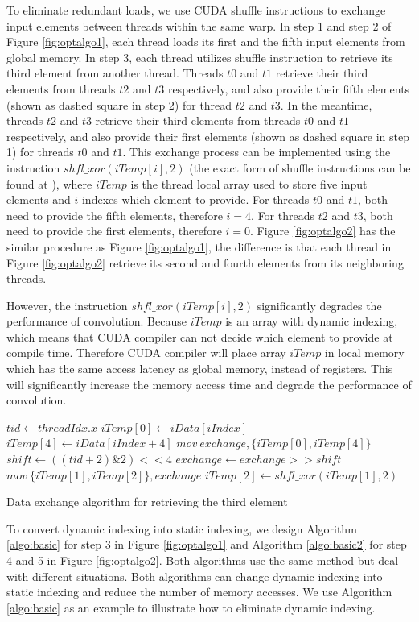 \documentclass[sigplan,review,anonymous]{acmart}\settopmatter{printfolios=true,printccs=false,printacmref=false}
\begin{document}
To eliminate redundant loads, we use CUDA shuffle instructions to exchange input elements between threads within the same warp. In step 1 and step 2 of Figure \ref{fig:optalgo1}, each thread loads its first and the fifth input elements from global memory. In step 3, each thread utilizes shuffle instruction to retrieve its third element from another thread. Threads $t0$ and $t1$ retrieve their third elements from threads $t2$ and $t3$ respectively, and also provide their fifth elements (shown as dashed square in step 2) for thread $t2$ and $t3$. In the meantime, threads $t2$ and $t3$ retrieve their third elements from threads $t0$ and $t1$ respectively, and also provide their first elements (shown as dashed square in step 1) for threads $t0$ and $t1$. This exchange process can be implemented using the instruction $shfl\_xor(iTemp[i],2)$ (the exact form of shuffle instructions can be found at \cite{CUDAtoolkit}), where $iTemp$ is the thread local array used to store five input elements and $i$ indexes which element to provide. For threads $t0$ and $t1$, both need to provide the fifth elements, therefore $i=4$. For threads $t2$ and $t3$, both need to provide the first elements, therefore $i=0$. Figure \ref{fig:optalgo2} has the similar procedure as Figure \ref{fig:optalgo1}, the difference is that each thread in Figure \ref{fig:optalgo2} retrieve its second and fourth elements from its neighboring threads.


However, the instruction $shfl\_xor(iTemp[i],2)$ significantly degrades the performance of convolution. Because $iTemp$ is an array with dynamic indexing, which means that CUDA compiler can not decide which element to provide at compile time. Therefore CUDA compiler will place array $iTemp$ in local memory which has the same access latency as global memory, instead of registers. This will significantly increase the memory access time and degrade the performance of convolution.

\begin{algorithm}
	$tid \gets threadIdx.x$\;
	$iTemp[0] \gets iData[iIndex]$\;
	$iTemp[4] \gets iData[iIndex+4]$\;
	$mov\ exchange, \{iTemp[0], iTemp[4]\}$\;
	$shift \gets ((tid+2)\&2)<<4$\;
	$exchange \gets exchange >> shift$\;
	$mov\ \{iTemp[1],iTemp[2]\}, exchange$\;
	$iTemp[2] \gets shfl\_xor(iTemp[1],2)$\;	
	
	\caption{Data exchange algorithm for retrieving the third element}
	\label{algo:basic}
\end{algorithm}

To convert dynamic indexing into static indexing, we design Algorithm \ref{algo:basic} for step 3 in Figure \ref{fig:optalgo1} and Algorithm \ref{algo:basic2} for step 4 and 5 in Figure \ref{fig:optalgo2}. Both algorithms use the same method but deal with different situations. Both algorithms can change dynamic indexing into static indexing and reduce the number of memory accesses. We use Algorithm \ref{algo:basic} as an example to illustrate how to eliminate dynamic indexing. 
\end{document}
